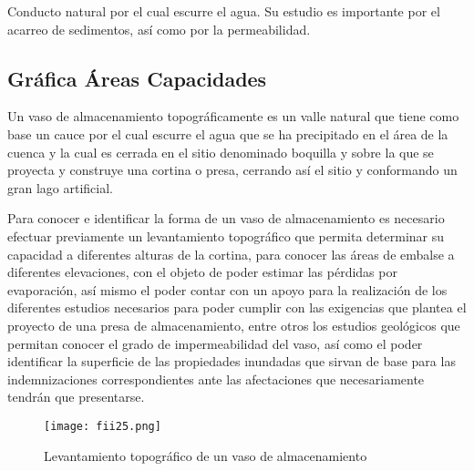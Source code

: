 \begin{definition}[Cauce]
	Conducto natural por el cual escurre el agua. Su estudio es importante por el
	acarreo de sedimentos, así como por la permeabilidad.
\end{definition}

\subsection{Gráfica Áreas Capacidades}

Un vaso de almacenamiento topográficamente es un valle natural que tiene
como base un cauce por el cual escurre el agua que se ha precipitado en el área de la
cuenca y la cual es cerrada en el sitio denominado boquilla y sobre la que se proyecta y
construye una cortina o presa, cerrando así el sitio y conformando un gran lago
artificial.

Para conocer e identificar la forma de un vaso de almacenamiento es necesario
efectuar previamente un levantamiento topográfico que permita determinar su
capacidad a diferentes alturas de la cortina, para conocer las áreas de embalse a
diferentes elevaciones, con el objeto de poder estimar las pérdidas por evaporación, así
mismo el poder contar con un apoyo para la realización de los diferentes estudios
necesarios para poder cumplir con las exigencias que plantea el proyecto de una presa
de almacenamiento, entre otros los estudios geológicos que permitan conocer el grado
de impermeabilidad del vaso, así como el poder identificar la superficie de las
propiedades inundadas que sirvan de base para las indemnizaciones correspondientes
ante las afectaciones que necesariamente tendrán que presentarse.

\begin{figure}[h!]
	\centerline{\texttt{[image: fii25.png]}}
	\caption{Levantamiento topográfico de un vaso de almacenamiento}
	\label{fii25}
\end{figure}

